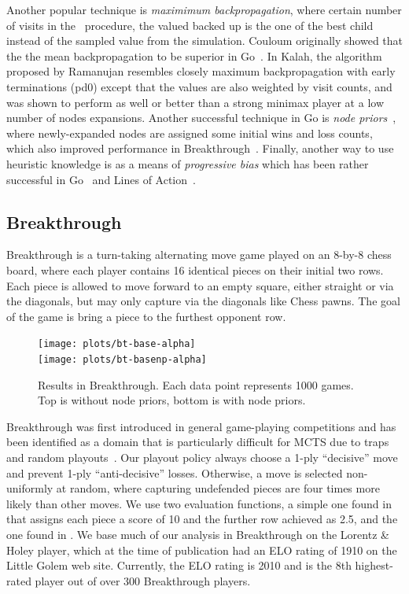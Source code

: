 \documentclass[letterpaper]{article}
\begin{document}
Another popular technique is {\it maximimum backpropagation}, where certain number of visits in the \Update~procedure,
the valued backed up is the one of the best child instead of the sampled value from the simulation.
Couloum originally showed that the the mean backpropagation to be superior in Go~\cite{Coulom06Efficient}. 
In Kalah, the \UCTMAXH algorithm proposed by Ramanujan resembles closely maximum backpropagation with early terminations 
(pd0) except that the values are also weighted by visit counts, and was shown to perform as well or better than a strong minimax 
player at a low number of nodes expansions. Another successful technique in Go is 
{\it node priors}~\cite{Gelly07Combining}, where newly-expanded nodes are assigned some initial wins and loss counts, 
which also improved performance in Breakthrough~\cite{Lorentz13Breakthrough}. Finally, another way to use 
heuristic knowledge is as a means of {\it progressive bias} which has been rather successful
in Go~\cite{Gelly07Combining,ChaslotWHUB2008} and Lines of Action~\cite{Winands10MCTS-LOA}.

\subsection{Breakthrough}

Breakthrough is a turn-taking alternating move game played on an 8-by-8 chess board, where each player 
contains 16 identical pieces on their initial two rows. 
Each piece is allowed to move forward to an empty square, either straight or via the diagonals, but may only 
capture via the diagonals like Chess pawns. The goal of the game is bring a piece to the furthest opponent row. 

\begin{figure}
\begin{center}
\texttt{[image: plots/bt-base-alpha]}\\
\texttt{[image: plots/bt-basenp-alpha]}
\caption{Results in Breakthrough. Each data point represents 1000 games. 
Top is without node priors, bottom is with node priors.} 
\label{fig:bt-base-alpha}
\end{center}
\end{figure}

Breakthrough was first introduced in general game-playing competitions and has been identified as a domain 
that is particularly difficult for MCTS due to traps and random playouts~\cite{Gudmindsson13Sufficiency}. 
Our playout policy always choose a 1-ply ``decisive'' move and prevent 1-ply ``anti-decisive'' losses. 
Otherwise, a move is selected non-uniformly at random, where capturing undefended pieces are four times more
likely than other moves. We use two evaluation functions, a simple one found in \cite{Schadd11PhdThesis} 
that assigns each piece a score of 10 and the further row achieved as 2.5, and the one found in 
\cite{Lorentz13Breakthrough}. 
We base much of our analysis in Breakthrough on the Lorentz \& Holey player, which 
at the time of publication had an ELO rating of 1910 on the Little Golem web site. 
Currently, the ELO rating is 2010 and is the 8th highest-rated player out of over 300 Breakthrough players. 
\end{document}
